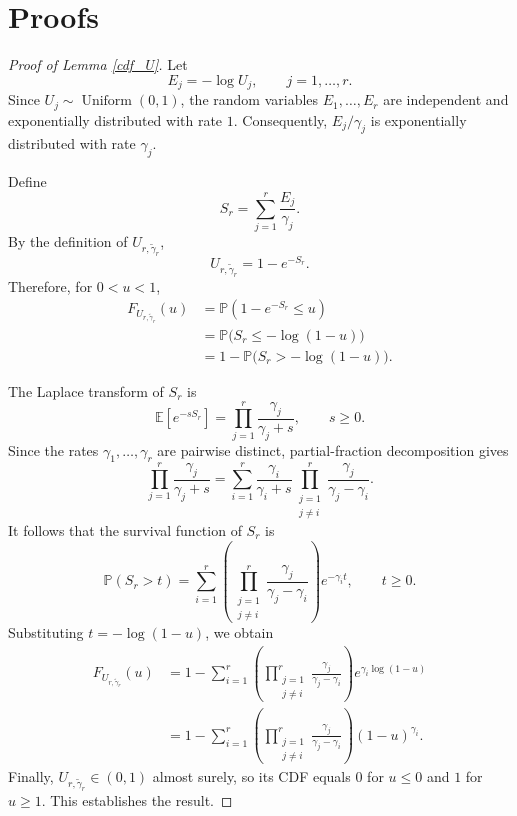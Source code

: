 \documentclass[authoryear,preprint,3p,review,10pt]{elsarticle}
\theoremstyle{definition}
\begin{document}
	\section{Proofs}
	
	\begin{proof}[Proof of Lemma \ref{cdf_U}]
		Let
		\[
		E_j=-\log U_j,\qquad j=1,\ldots,r.
		\]
		Since \(U_j\sim\operatorname{Uniform}(0,1)\), the random variables \(E_1,\ldots,E_r\) are independent and exponentially distributed with rate \(1\). Consequently, \(E_j/\gamma_j\) is exponentially distributed with rate \(\gamma_j\).
		
		Define
		\[
		S_r=\sum_{j=1}^{r}\frac{E_j}{\gamma_j}.
		\]
		By the definition of \(U_{r,\tilde{\gamma}_r}\),
		\[
		U_{r,\tilde{\gamma}_r}=1-e^{-S_r}.
		\]
		Therefore, for \(0<u<1\),
		\[
		\begin{aligned}
			F_{U_{r,\tilde{\gamma}_r}}(u)
			&=\mathbb{P}(1-e^{-S_r}\le u)\\
			&=\mathbb{P}\bigl(S_r\le-\log(1-u)\bigr)\\
			&=1-\mathbb{P}\bigl(S_r>-\log(1-u)\bigr).
		\end{aligned}
		\]
		
		The Laplace transform of \(S_r\) is
		\[
		\mathbb{E}[e^{-sS_r}]
		=\prod_{j=1}^{r}\frac{\gamma_j}{\gamma_j+s},
		\qquad s\ge0.
		\]
		Since the rates \(\gamma_1,\ldots,\gamma_r\) are pairwise distinct, partial-fraction decomposition gives
		\[
		\prod_{j=1}^{r}\frac{\gamma_j}{\gamma_j+s}
		=\sum_{i=1}^{r}
		\frac{\gamma_i}{\gamma_i+s}
		\prod_{\substack{j=1\\j\ne i}}^{r}
		\frac{\gamma_j}{\gamma_j-\gamma_i}.
		\]
		It follows that the survival function of \(S_r\) is
		\[
		\mathbb{P}(S_r>t)
		=\sum_{i=1}^{r}
		\left(
		\prod_{\substack{j=1\\j\ne i}}^{r}
		\frac{\gamma_j}{\gamma_j-\gamma_i}
		\right)e^{-\gamma_i t},
		\qquad t\ge0.
		\]
		Substituting \(t=-\log(1-u)\), we obtain
		\[
		\begin{aligned}
			F_{U_{r,\tilde{\gamma}_r}}(u)
			&=1-\sum_{i=1}^{r}
			\left(
			\prod_{\substack{j=1\\j\ne i}}^{r}
			\frac{\gamma_j}{\gamma_j-\gamma_i}
			\right)e^{\gamma_i\log(1-u)}\\
			&=1-\sum_{i=1}^{r}
			\left(
			\prod_{\substack{j=1\\j\ne i}}^{r}
			\frac{\gamma_j}{\gamma_j-\gamma_i}
			\right)(1-u)^{\gamma_i}.
		\end{aligned}
		\]
		Finally, \(U_{r,\tilde{\gamma}_r}\in(0,1)\) almost surely, so its CDF equals \(0\) for \(u\le0\) and \(1\) for \(u\ge1\). This establishes the result.
	\end{proof}
	
\end{document}
